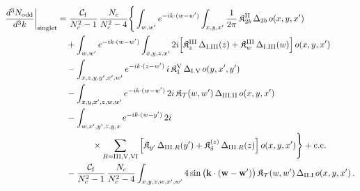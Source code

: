 \begin{align}\label{eq:sodd}
\frac{d^3N_{\rm odd}}{d^3k}\bigg|_{\rm singlet}&=\frac{\mathcal C_{\rm f}}{N_c^2-1}\,\frac{N_c}{N_c^2-4}\Bigg\{\int_{w,w'}e^{-ik\cdot(w-w')}\int_{x,y,x'}\frac{1}{2\pi}\,\mathfrak K^{\rm II}_{2b}\,\Delta_{2b}\,o(x,y,x')\notag\\
&\quad+\int_{w,w'}e^{-ik\cdot(w-w')}\int_{x,y,z,x'}2i\Big[\mathfrak K^{\rm III}_z\,\Delta_{\rm I.III}(z)+\mathfrak K^{\rm III}_w\,\Delta_{\rm I.III}(w)\Big]\,o(x,y,x')\notag\\
&\quad-\int_{x,z,y,y',x',w'}e^{-ik\cdot(z-w')}\,i\,\mathfrak K^{\rm V}_1\,\Delta_{\rm I.V}\,o(y,x',y')\notag\\
&\quad-\int_{x,y,x',z,w,w'}e^{-ik\cdot(w-w')}\,2i\,\mathfrak K_{\mathcal T}(w,w')\,\Delta_{\rm III.II}\,o(x,y,x')\notag\\
&\quad-\int_{w,x',y',z,y,x}e^{-ik\cdot(w-y')}\,2i\notag\\&\qquad\qquad\times\sum_{R={\rm III,V,VI}}\Big[\mathfrak K_{y'}\,\Delta_{{\rm III}.R}(y')+\mathfrak K^{(z)}_\delta\,\Delta_{{\rm III}.R}(z)\Big]\,o(x,y,x')\Bigg\}+{\rm c.c.}\notag\\
&\quad-\frac{\mathcal C_{\rm f}}{N_c^2-1}\,\frac{N_c}{N_c^2-4}\int_{x,y,z,w,x',w'}4\sin\big(\mathbf{k}\cdot(\mathbf{w}-\mathbf{w}')\big)\,\mathfrak K_{\mathcal T}(w,w')\,\Delta_{\rm II.I}\,o(x,y,x')\,.
\end{align}
